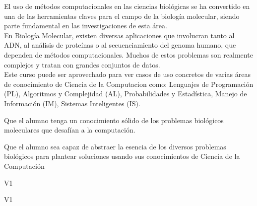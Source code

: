 \begin{syllabus}


\begin{justification}
El uso de métodos computacionales en las ciencias biológicas se ha convertido en una de las herramientas claves para el campo de la biología molecular, siendo parte fundamental en las investigaciones de esta área. 
\\
En Biología Molecular, existen diversas aplicaciones que involucran tanto al ADN, al análisis de proteínas o al secuenciamiento del genoma humano, que dependen de métodos computacionales. Muchos de estos problemas son realmente complejos y tratan con grandes conjuntos de datos. 
\\
Este curso puede ser aprovechado para ver casos de uso concretos de varias áreas de conocimiento de Ciencia de la Computacion como: Lenguajes de Programación (PL), Algoritmos y Complejidad (AL), Probabilidades y Estadística, Manejo de Información (IM), Sistemas Inteligentes (IS).
\end{justification}

\begin{goals}
\item Que el alumno tenga un conocimiento sólido de los problemas biológicos moleculares que desafían a la computación.
\item Que el alumno sea capaz de abstraer la esencia de los diversos problemas biológicos para plantear soluciones usando sus conocimientos de Ciencia de la Computación
\end{goals}

\begin{outcomes}{V1}
    \item {}
    \item {}
    \item {}
\end{outcomes}

\begin{competences}{V1}
    \item {} 
    \item {}
    \item {}
\end{competences}


\end{syllabus}
